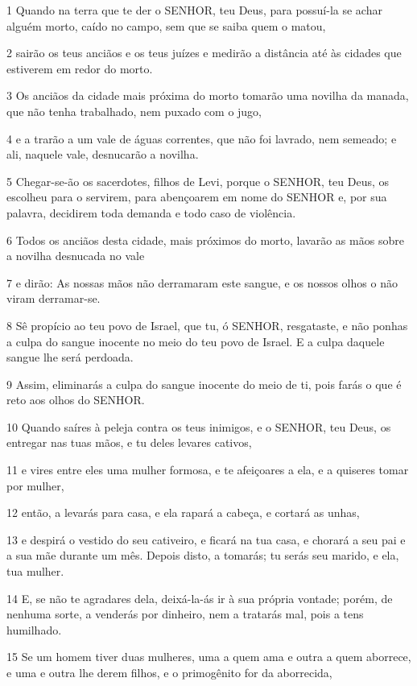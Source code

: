 \par 1 Quando na terra que te der o SENHOR, teu Deus, para possuí-la se achar alguém morto, caído no campo, sem que se saiba quem o matou,
\par 2 sairão os teus anciãos e os teus juízes e medirão a distância até às cidades que estiverem em redor do morto.
\par 3 Os anciãos da cidade mais próxima do morto tomarão uma novilha da manada, que não tenha trabalhado, nem puxado com o jugo,
\par 4 e a trarão a um vale de águas correntes, que não foi lavrado, nem semeado; e ali, naquele vale, desnucarão a novilha.
\par 5 Chegar-se-ão os sacerdotes, filhos de Levi, porque o SENHOR, teu Deus, os escolheu para o servirem, para abençoarem em nome do SENHOR e, por sua palavra, decidirem toda demanda e todo caso de violência.
\par 6 Todos os anciãos desta cidade, mais próximos do morto, lavarão as mãos sobre a novilha desnucada no vale
\par 7 e dirão: As nossas mãos não derramaram este sangue, e os nossos olhos o não viram derramar-se.
\par 8 Sê propício ao teu povo de Israel, que tu, ó SENHOR, resgataste, e não ponhas a culpa do sangue inocente no meio do teu povo de Israel. E a culpa daquele sangue lhe será perdoada.
\par 9 Assim, eliminarás a culpa do sangue inocente do meio de ti, pois farás o que é reto aos olhos do SENHOR.
\par 10 Quando saíres à peleja contra os teus inimigos, e o SENHOR, teu Deus, os entregar nas tuas mãos, e tu deles levares cativos,
\par 11 e vires entre eles uma mulher formosa, e te afeiçoares a ela, e a quiseres tomar por mulher,
\par 12 então, a levarás para casa, e ela rapará a cabeça, e cortará as unhas,
\par 13 e despirá o vestido do seu cativeiro, e ficará na tua casa, e chorará a seu pai e a sua mãe durante um mês. Depois disto, a tomarás; tu serás seu marido, e ela, tua mulher.
\par 14 E, se não te agradares dela, deixá-la-ás ir à sua própria vontade; porém, de nenhuma sorte, a venderás por dinheiro, nem a tratarás mal, pois a tens humilhado.
\par 15 Se um homem tiver duas mulheres, uma a quem ama e outra a quem aborrece, e uma e outra lhe derem filhos, e o primogênito for da aborrecida,
